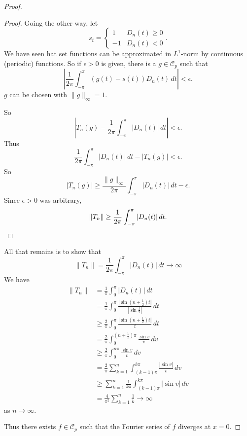 \documentclass[10pt, oneside, reqno]{amsbook}
\theoremstyle{plain}%
\theoremstyle{definition}
\theoremstyle{remark}
\begin{document}
\begin{proof}
\begin{proof}
    Going the other way, let \[
        s_t = \begin{cases}
        1 &D_n(t) \geq 0 \\
        -1 &D_n(t) < 0
        \end{cases}.
    \]  We have seen hat set functions can be approximated in $L^1$-norm by continuous (periodic) functions.  So if $\epsilon > 0$ is given, there is a $g \in \mathcal C_p$ such that \[
        \left| \frac{1}{2\pi} \int_{-\pi}^\pi (g(t) - s(t))D_n(t) \, dt \right| < \epsilon. 
    \] $g$ can be chosen with $\| g \|_\infty = 1$.  
    
      So \[
        \left| T_n(g) - \frac{1}{2\pi} \int_{-\pi}^\pi |D_n(t)| \, dt \right| < \epsilon.
    \]  Thus \[
        \frac{1}{2\pi} \int_{-\pi}^\pi |D_n(t) | \, dt - |T_n(g)| < \epsilon.  
    \]  So \[
        |T_n(g)| \geq \frac{\| g \|_\infty}{2 \pi} \int_{-\pi}^\pi |D_n(t)| \, dt - \epsilon. 
    \]  Since $\epsilon > 0$ was arbitrary, \[
        \|T_n \| \geq \frac{1}{2 \pi} \int_{-\pi}^\pi |D_n(t) | \, dt. \qedhere
    \]
\end{proof}

All that remains is to show that \[
    \|T_n \| = \frac{1}{2\pi} \int_{-\pi}^\pi |D_n(t)| \, dt \rightarrow \infty
\]  We have 
\begin{align*}
    \|T_n \|    &= \frac{1}{\pi}\int_0^\pi |D_n(t) | \, dt \\
                &= \frac{1}{\pi} \int_0^\pi \frac{|\sin(n+\frac{1}{2})t|}{|\sin \frac{t}{2}|} \, dt \\
                &\geq \frac{2}{\pi} \int_0^\pi \frac{|\sin(n+\frac{1}{2}) t |}{t} \, dt \\
                &= \frac{2}{\pi} \int_0^{(n+\frac{1}{2})\pi} \frac{\sin v}{v} \, dv \\
                &\geq \frac{2}{\pi} \int_0^{n\pi} \frac{\sin v}{v} \, dv \\
                &= \frac{2}{\pi} \sum_{k=1}^n \int_{(k-1)\pi}^{k \pi} \frac{|\sin v|}{v} \, dv \\
                &\geq \sum_{k=1}^n \frac{1}{k \pi} \int_{(k-1)\pi}^{k \pi} |\sin v | \, dv \\
                &= \frac{4}{\pi^2} \sum_{k =1 }^n \frac{1}{k} \rightarrow \infty
\end{align*} as $n \rightarrow \infty$.  

Thus there exists $f \in \mathcal C_p$ such that the Fourier series of $f$ diverges at $x = 0$.  
\end{proof}
\end{document}
